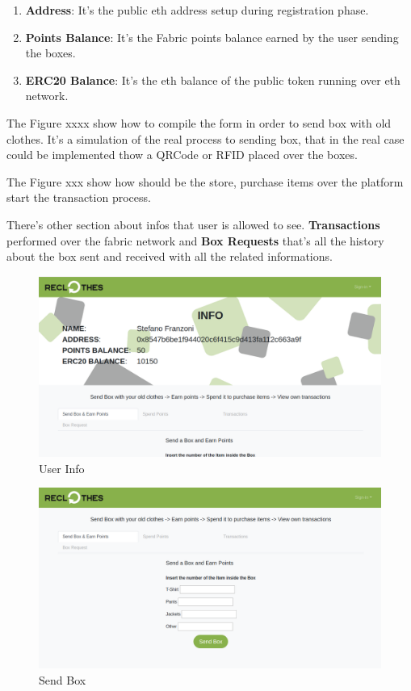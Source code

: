 {\begin{enumerate}[-]
    \item \textbf{Address}: It's the public eth address setup during registration phase. 
    \item \textbf{Points Balance}: It's the Fabric points balance earned by the user sending the boxes.
    \item \textbf{ERC20 Balance}: It's the eth balance of the public token running over eth network.
\end{enumerate}

The Figure xxxx show how to compile the form in order to send box with old clothes. It's a simulation
of the real process to sending box, that in the real case could be implemented thow a QRCode or RFID
placed over the boxes.

The Figure xxx show how should be the store, purchase items over the platform start the transaction 
process. 

There's other section about infos that user is allowed to see. \textbf{Transactions} performed over
the fabric network and \textbf{Box Requests} that's all the history about the box sent and received
with all the related informations. 

\begin{figure}[h!]
    \centering
    \includegraphics[totalheight=7.5cm]{img/dapp/user-info.png}
    \caption{User Info}
    \label{fig:user_info}
\end{figure}

\begin{figure}[h!]
    \centering
    \includegraphics[totalheight=7.5cm]{img/dapp/user-send.png}
    \caption{Send Box}
    \label{fig:send_box}
\end{figure}

}
